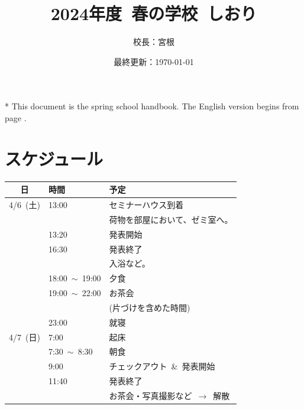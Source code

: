 \documentclass[unicode,a4paper,11pt]{ltjsarticle}
\title{
    2024年度\ 春の学校\ しおり
}
\author{
  校長：宮根
}
\date{最終更新：\today}
\begin{document}
\maketitle

* This document is the spring school handbook. The English version begins from page \pageref{eng_page}.

\tableofcontents



\clearpage

\section{スケジュール}

\begin{center}
      \begin{tabular}{cll}\hline
            日        & 時間                 & 予定                                      \\ \hline
            4/6\ (土) & 13:00                & セミナーハウス到着                        \\
                      &                      & 荷物を部屋において、ゼミ室へ。            \\
                      & 13:20                & 発表開始                                  \\
                      & 16:30                & 発表終了                                  \\
                      &                      & 入浴など。                                \\
                      & 18:00\ $\sim$\ 19:00 & 夕食                                      \\
                      & 19:00\ $\sim$\ 22:00 & お茶会                                    \\
                      &                      & (片づけを含めた時間)                      \\
                      & 23:00                & 就寝                                      \\ \hline
            4/7\ (日) & 7:00                 & 起床                                      \\
                      & 7:30\ $\sim$\  8:30  & 朝食                                      \\
                      & 9:00                 & チェックアウト\ \&\ 発表開始              \\
                      & 11:40                & 発表終了                                  \\
                      &                      & お茶会・写真撮影など\ $\rightarrow$\ 解散 \\ \hline
      \end{tabular}
\end{center}
\end{document}
